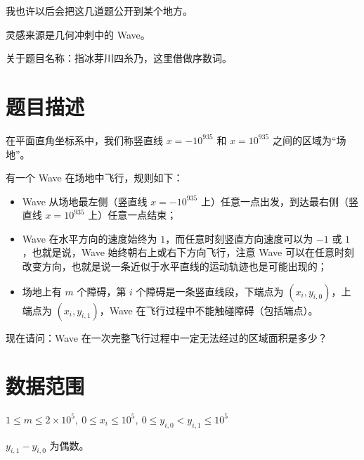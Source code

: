 \documentclass[a4paper,10pt]{article}
\begin{document}
我也许以后会把这几道题公开到某个地方。

灵感来源是几何冲刺中的 Wave。

关于题目名称：指冰芽川四糸乃，这里借做序数词。

\section*{题目描述}

在平面直角坐标系中，我们称竖直线 $x=-10^{935}$ 和 $x=10^{935}$ 之间的区域为“场地”。

有一个 Wave 在场地中飞行，规则如下：

\begin{itemize}
\item Wave 从场地最左侧（竖直线 $x=-10^{935}$ 上）任意一点出发，到达最右侧（竖直线 $x=10^{935}$ 上）任意一点结束；

\item Wave 在水平方向的速度始终为 $1$，而任意时刻竖直方向速度可以为 $-1$ 或 $1$，也就是说，Wave 始终朝右上或右下方向飞行，注意 Wave 可以在任意时刻改变方向，也就是说一条近似于水平直线的运动轨迹也是可能出现的；

\item 场地上有 $m$ 个障碍，第 $i$ 个障碍是一条竖直线段，下端点为 $(x_i,y_{i,0})$，上端点为 $(x_i,y_{i,1})$，Wave 在飞行过程中不能触碰障碍（包括端点）。
\end{itemize}

现在请问：Wave 在一次完整飞行过程中一定无法经过的区域面积是多少？

\section*{数据范围}

$1\leq m\leq 2\times 10^5,\ 0\leq x_i\leq 10^5,\ 0\leq y_{i,0}< y_{i,1}\leq 10^5$


$y_{i,1}-y_{i,0}$ 为偶数。

\newpage
\end{document}
